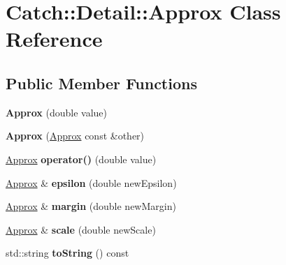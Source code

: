 \hypertarget{classCatch_1_1Detail_1_1Approx}{}\section{Catch\+:\+:Detail\+:\+:Approx Class Reference}
\label{classCatch_1_1Detail_1_1Approx}
\subsection*{Public Member Functions}
\begin{DoxyCompactItemize}
\item 
\mbox{\label{classCatch_1_1Detail_1_1Approx_a1a8618ea8db08c66bd3d9fe8f74b957a}} 
{\bfseries Approx} (double value)
\item 
\mbox{\label{classCatch_1_1Detail_1_1Approx_a807330c63266fc914abdf6e461255a54}} 
{\bfseries Approx} (\hyperlink{classCatch_1_1Detail_1_1Approx}{Approx} const \&other)
\item 
\mbox{\label{classCatch_1_1Detail_1_1Approx_a48c9cbc28a05dc9dc8c3973b9eae2268}} 
\hyperlink{classCatch_1_1Detail_1_1Approx}{Approx} {\bfseries operator()} (double value)
\item 
\mbox{\label{classCatch_1_1Detail_1_1Approx_a05c50c3ad0a971fab19345b5d94979a9}} 
\hyperlink{classCatch_1_1Detail_1_1Approx}{Approx} \& {\bfseries epsilon} (double new\+Epsilon)
\item 
\mbox{\label{classCatch_1_1Detail_1_1Approx_a82f7049b41c16e6234275641fad22218}} 
\hyperlink{classCatch_1_1Detail_1_1Approx}{Approx} \& {\bfseries margin} (double new\+Margin)
\item 
\mbox{\label{classCatch_1_1Detail_1_1Approx_acd80f0737bf38112beacd5ca95bef113}} 
\hyperlink{classCatch_1_1Detail_1_1Approx}{Approx} \& {\bfseries scale} (double new\+Scale)
\item 
\mbox{\label{classCatch_1_1Detail_1_1Approx_a972fd9ac60607483263f1b0f0f9955e6}} 
std\+::string {\bfseries to\+String} () const
\end{DoxyCompactItemize}
